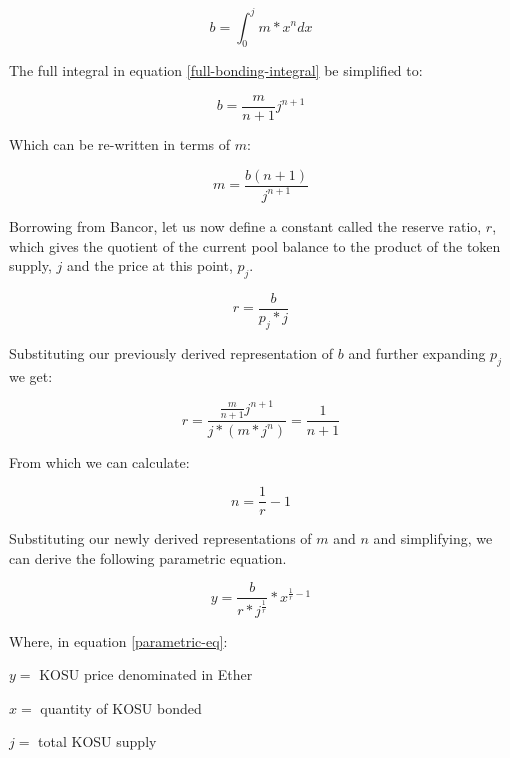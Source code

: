 \documentclass[10pt]{article}
\begin{document}
\begin{equation}\label{full-bonding-integral}
  b = \int_{0}^{j} m*x^n dx
\end{equation}
\medskip

\noindent The full integral in equation \ref{full-bonding-integral} be simplified to:

\begin{equation}
  b = \frac{m}{n+1}j^{n+1}
\end{equation}
\medskip

\noindent Which can be re-written in terms of $m$: 

\begin{equation}
  m = \frac{b(n+1)}{j^{n+1}}
\end{equation}
\medskip

Borrowing from Bancor, let us now define a constant called the reserve ratio, $r$, which gives the quotient of the current pool balance to the product of the token supply, $j$ and the price at this point, $p_j$\cite{bancor-whitepaper}.

\begin{equation}
  r = \frac{b}{p_j*j}
\end{equation}
\medskip

\noindent Substituting our previously derived representation of $b$ and further expanding $p_j$ we get:

\begin{equation}
  r = \frac{\frac{m}{n+1}j^{n+1}}{j*(m*j^n)} = \frac{1}{n+1}
\end{equation}
\medskip

\noindent From which we can calculate:

\begin{equation}
  n = \frac{1}{r}-1
\end{equation}
\medskip

\noindent Substituting our newly derived representations of $m$ and $n$ and simplifying, we can derive the following parametric equation.

\begin{equation}\label{parametric-eq}
  y = \frac{b}{r*j^{\frac{1}{r}}}*x^{\frac{1}{r}-1}
\end{equation}

\noindent Where, in equation \ref{parametric-eq}:
\medskip 

$y = $ KOSU price denominated in Ether

$x = $ quantity of KOSU bonded

$j = $ total KOSU supply
\end{document}
